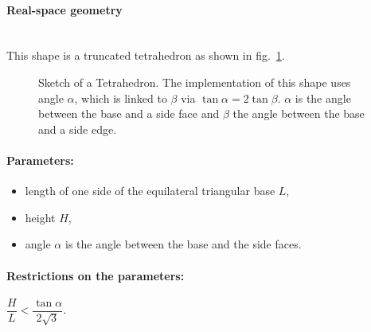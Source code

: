 \paragraph{Real-space geometry}\mbox{}\\
This shape is a truncated tetrahedron as shown in fig.~\ref{fig:tetrahedron}.

\begin{figure}[ht]
\hfill
{}
\hfill
{}
\hfill
\caption{Sketch of a Tetrahedron. The implementation of this shape uses angle
  $\alpha$, which is linked to $\beta$ via $\tan \alpha = 2 \tan 
  \beta$. $\alpha$ is the angle between the base and a side face and $\beta$
  the angle between the base and a side edge.}
\label{fig:tetrahedron}
\end{figure}

\FloatBarrier

\paragraph{Parameters:}
\begin{itemize}
\item length of one side of the equilateral triangular base $L$,
\item height $H$,
\item angle $\alpha$ is the angle between the base and the
  side faces.
\end{itemize}

\paragraph{Restrictions on the parameters:} 
$\dfrac{H}{L}< \dfrac{\tan{\alpha}}{2\sqrt{3}}$.

